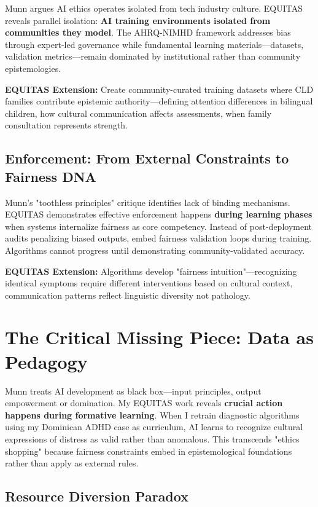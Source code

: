 \documentclass[11pt,twoside]{article}
\begin{document}
Munn argues AI ethics operates isolated from tech industry culture. EQUITAS reveals parallel isolation: \textbf{AI training environments isolated from communities they model}. The AHRQ-NIMHD framework addresses bias through expert-led governance while fundamental learning materials—datasets, validation metrics—remain dominated by institutional rather than community epistemologies.

\textbf{EQUITAS Extension:} Create community-curated training datasets where CLD families contribute epistemic authority—defining attention differences in bilingual children, how cultural communication affects assessments, when family consultation represents strength.

\subsection{Enforcement: From External Constraints to Fairness DNA}

Munn's "toothless principles" critique identifies lack of binding mechanisms. EQUITAS demonstrates effective enforcement happens \textbf{during learning phases} when systems internalize fairness as core competency. Instead of post-deployment audits penalizing biased outputs, embed fairness validation loops during training. Algorithms cannot progress until demonstrating community-validated accuracy.

\textbf{EQUITAS Extension:} Algorithms develop "fairness intuition"—recognizing identical symptoms require different interventions based on cultural context, communication patterns reflect linguistic diversity not pathology.

\section{The Critical Missing Piece: Data as Pedagogy}

Munn treats AI development as black box—input principles, output empowerment or domination. My EQUITAS work reveals \textbf{crucial action happens during formative learning}. When I retrain diagnostic algorithms using my Dominican ADHD case as curriculum, AI learns to recognize cultural expressions of distress as valid rather than anomalous. This transcends "ethics shopping" because fairness constraints embed in epistemological foundations rather than apply as external rules.

\subsection{Resource Diversion Paradox}
\end{document}
